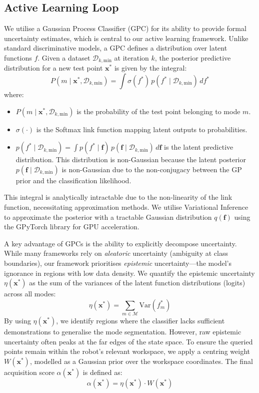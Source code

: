 \documentclass[journal]{IEEEtran}
\begin{document}
\subsection{Active Learning Loop}
We utilise a Gaussian Process Classifier (GPC) for its ability to provide formal uncertainty estimates, which is central to our active learning framework. Unlike standard discriminative models, a GPC defines a distribution over latent functions $f$. Given a dataset $\mathcal{D}_{k,\text{min}}$ at iteration $k$, the posterior predictive distribution for a new test point $\mathbf{x}^*$ is given by the integral:
\begin{equation}
P(m \mid \mathbf{x}^*, \mathcal{D}_{k,\text{min}}) = \int \sigma(f^*) \, p(f^* \mid \mathcal{D}_{k,\text{min}}) \, df^*
\end{equation}
where:
\begin{itemize}
\item $P(m \mid \mathbf{x}^*, \mathcal{D}_{k,\text{min}})$ is the probability of the test point belonging to mode $m$.
\item $\sigma(\cdot)$ is the Softmax link function mapping latent outputs to probabilities.
\item $p(f^* \mid \mathcal{D}_{k,\text{min}}) = \int p(f^* \mid \mathbf{f}) \, p(\mathbf{f} \mid \mathcal{D}_{k,\text{min}}) \, d\mathbf{f}$ is the latent predictive distribution. This distribution is non-Gaussian because the latent posterior $p(\mathbf{f} \mid \mathcal{D}_{k,\text{min}})$ is non-Gaussian due to the non-conjugacy between the GP prior and the classification likelihood.
\end{itemize}
This integral is analytically intractable due to the non-linearity of the link function, necessitating approximation methods. We utilise Variational Inference to approximate the posterior with a tractable Gaussian distribution $q(\mathbf{f})$ using the GPyTorch library \cite{gardner2018gpytorch} for GPU acceleration.

A key advantage of GPCs is the ability to explicitly decompose uncertainty. While many frameworks rely on \textit{aleatoric} uncertainty (ambiguity at class boundaries), our framework prioritises \textit{epistemic} uncertainty—the model's ignorance in regions with low data density. We quantify the epistemic uncertainty $\eta(\mathbf{x}^*)$ as the sum of the variances of the latent function distributions (logits) across all modes:
\begin{equation}
\eta(\mathbf{x}^*) = \sum_{m \in \mathcal{M}} \text{Var}(f^*_m)
\end{equation}
By using $\eta(\mathbf{x}^*)$, we identify regions where the classifier lacks sufficient demonstrations to generalise the mode segmentation. However, raw epistemic uncertainty often peaks at the far edges of the state space. To ensure the queried points remain within the robot's relevant workspace, we apply a centring weight $W(\mathbf{x}^*)$, modelled as a Gaussian prior over the workspace coordinates. The final acquisition score $\alpha(\mathbf{x}^*)$ is defined as:
\begin{equation}
\alpha(\mathbf{x}^*) = \eta(\mathbf{x}^*) \cdot W(\mathbf{x}^*)
\end{equation}
\end{document}

